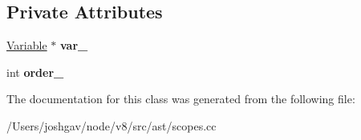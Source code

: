 \subsection*{Private Attributes}
\begin{DoxyCompactItemize}
\item 
\hyperlink{classv8_1_1internal_1_1_variable}{Variable} $\ast$ {\bfseries var\+\_\+}\hypertarget{classv8_1_1internal_1_1_var_and_order_ae7df322581dc1fbad484733e96b464b6}{}\label{classv8_1_1internal_1_1_var_and_order_ae7df322581dc1fbad484733e96b464b6}

\item 
int {\bfseries order\+\_\+}\hypertarget{classv8_1_1internal_1_1_var_and_order_abfadc10b4eb92b1f17bf0062a0e7ad3b}{}\label{classv8_1_1internal_1_1_var_and_order_abfadc10b4eb92b1f17bf0062a0e7ad3b}

\end{DoxyCompactItemize}


The documentation for this class was generated from the following file\+:\begin{DoxyCompactItemize}
\item 
/\+Users/joshgav/node/v8/src/ast/scopes.\+cc\end{DoxyCompactItemize}
